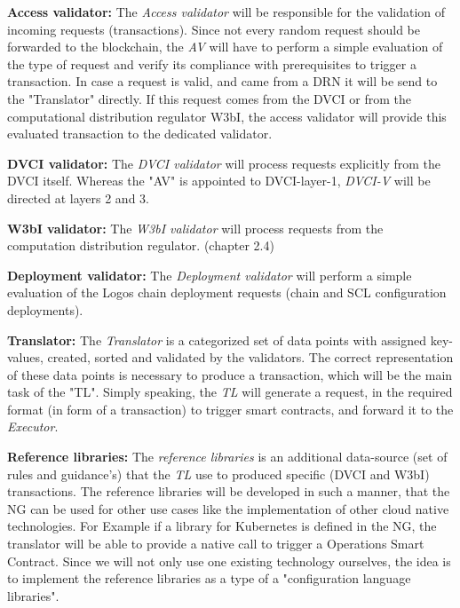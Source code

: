 \documentclass[]{article}
\begin{document}
\textbf{Access validator:}
The \textit{Access validator} will be responsible for the validation of incoming requests (transactions). 
Since not every random request should be forwarded to the blockchain, the \textit{AV} will have to perform a simple evaluation of the type of request and verify its compliance with prerequisites to trigger a transaction. 
In case a request is valid, and came from a DRN it will be send to the "Translator" directly.
If this request comes from the DVCI or from the computational distribution regulator W3bI, the access validator will provide this evaluated transaction to the dedicated validator.
\newline

\textbf{DVCI validator:}
The \textit{DVCI validator} will process requests explicitly from the DVCI itself.
Whereas the "AV" is appointed to DVCI-layer-1, \textit{DVCI-V} will be directed at layers 2 and 3.    
\newline

\textbf{W3bI validator:}
The \textit{W3bI validator} will process requests from the computation distribution regulator. (chapter 2.4) 
\newline

\textbf{Deployment validator:}
The \textit{Deployment validator} will perform a simple evaluation of the Logos chain deployment requests (chain and SCL configuration deployments).     
\newline

\textbf{Translator:}
The \textit{Translator} is a categorized set of data points with assigned key-values, created, sorted and validated by the validators. 
The correct representation of these data points is necessary to produce a transaction, which will be the main task of the "TL". 
Simply speaking, the \textit{TL} will generate a request, in the required format (in form of a transaction) to trigger smart contracts, and forward it to the \textit{Executor}.   
\newline

\textbf{Reference libraries:}
The \textit{reference libraries} is an additional data-source (set of rules and guidance's) that the \textit{TL} use to produced specific (DVCI and W3bI) transactions.
The reference libraries will be developed in such a manner, that the NG can be used for other use cases like the implementation of other cloud native technologies.
For Example if a library for Kubernetes is defined in the NG, the translator will be able to provide a native call to trigger a Operations Smart Contract.
Since we will not only use one existing technology ourselves, the idea is to implement the reference libraries as a type of a "configuration language libraries".
\newline
\end{document}
